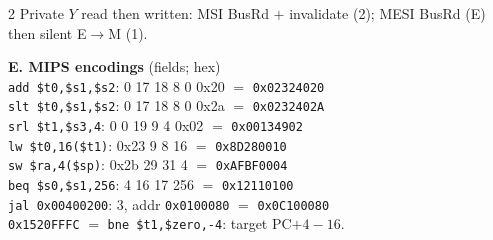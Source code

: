 \documentclass[10pt]{extarticle}
\newcommand{\tw}[1]{\texttt{#1}}
\begin{document}
\begin{multicols}{2}
Private $Y$ read then written: MSI BusRd $+$ invalidate (2); MESI BusRd (E) then silent E$\to$M (1).

\medskip
\noindent\textbf{E. MIPS encodings} (fields; hex)\\
{\footnotesize
\tw{add \$t0,\$s1,\$s2}: 0 17 18 8 0 0x20 $=$ \tw{0x02324020}\\
\tw{slt \$t0,\$s1,\$s2}: 0 17 18 8 0 0x2a $=$ \tw{0x0232402A}\\
\tw{srl \$t1,\$s3,4}: 0 0 19 9 4 0x02 $=$ \tw{0x00134902}\\
\tw{lw \$t0,16(\$t1)}: 0x23 9 8 16 $=$ \tw{0x8D280010}\\
\tw{sw \$ra,4(\$sp)}: 0x2b 29 31 4 $=$ \tw{0xAFBF0004}\\
\tw{beq \$s0,\$s1,256}: 4 16 17 256 $=$ \tw{0x12110100}\\
\tw{jal 0x00400200}: 3, addr \tw{0x0100080} $=$ \tw{0x0C100080}\\
\tw{0x1520FFFC} $=$ \tw{bne \$t1,\$zero,-4}: target PC$+4-16$.}
\end{multicols}
\end{document}
